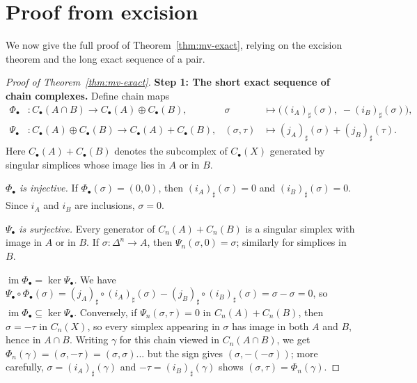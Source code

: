 \documentclass[12pt,a4paper,openany]{book}
\theoremstyle{definition}
\theoremstyle{plain}
\theoremstyle{remark}
\DeclareMathOperator{\im}{im}
\begin{document}
\section{Proof from excision}
\label{sec:mv-proof}

We now give the full proof of Theorem~\ref{thm:mv-exact}, relying
on the excision theorem and the long exact sequence of a pair.

\begin{proof}[Proof of Theorem~\ref{thm:mv-exact}]
\textbf{Step 1: The short exact sequence of chain complexes.}
Define chain maps
\begin{align*}
  \Phi_\bullet &\colon C_\bullet(A\cap B) \longrightarrow
    C_\bullet(A)\oplus C_\bullet(B),
    &\sigma &\longmapsto \bigl((i_A)_\sharp(\sigma),\;-(i_B)_\sharp(\sigma)\bigr),\\
  \Psi_\bullet &\colon C_\bullet(A)\oplus C_\bullet(B) \longrightarrow
    C_\bullet(A)+C_\bullet(B),
    &(\sigma,\tau) &\longmapsto (j_A)_\sharp(\sigma)+(j_B)_\sharp(\tau).
\end{align*}
Here $C_\bullet(A)+C_\bullet(B)$ denotes the subcomplex of $C_\bullet(X)$
generated by singular simplices whose image lies in $A$ or in $B$.

\emph{$\Phi_\bullet$ is injective.}
If $\Phi_\bullet(\sigma)=(0,0)$, then $(i_A)_\sharp(\sigma)=0$ and
$(i_B)_\sharp(\sigma)=0$. Since $i_A$ and $i_B$ are inclusions,
$\sigma=0$.

\emph{$\Psi_\bullet$ is surjective.}
Every generator of $C_n(A)+C_n(B)$ is a singular simplex with image in
$A$ or in $B$. If $\sigma\colon\Delta^n\to A$, then
$\Psi_n(\sigma,0)=\sigma$; similarly for simplices in $B$.

\emph{$\im\Phi_\bullet=\ker\Psi_\bullet$.}
We have $\Psi_\bullet\circ\Phi_\bullet(\sigma)
= (j_A)_\sharp\circ(i_A)_\sharp(\sigma) - (j_B)_\sharp\circ(i_B)_\sharp(\sigma) = \sigma-\sigma = 0$, so $\im\Phi_\bullet\subseteq\ker\Psi_\bullet$.
Conversely, if $\Psi_n(\sigma,\tau)=0$ in $C_n(A)+C_n(B)$, then
$\sigma=-\tau$ in $C_n(X)$, so every simplex appearing in $\sigma$
has image in both $A$ and $B$, hence in $A\cap B$. Writing
$\gamma$ for this chain viewed in $C_n(A\cap B)$, we get
$\Phi_n(\gamma)=(\sigma,-\tau)=(\sigma,\sigma)$... but the sign gives
$(\sigma,-(-\sigma))$; more carefully, $\sigma = (i_A)_\sharp(\gamma)$
and $-\tau=(i_B)_\sharp(\gamma)$ shows $(\sigma,\tau)=\Phi_n(\gamma)$.


\end{proof}
\end{document}
